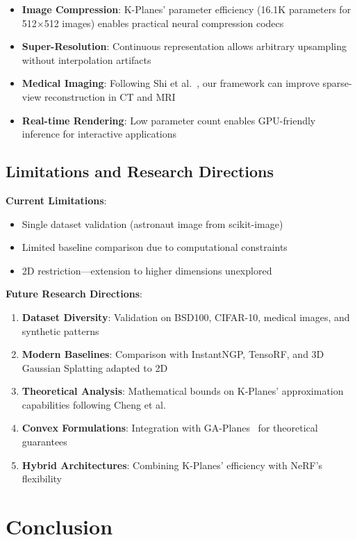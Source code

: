 \documentclass{article}
\begin{document}
\begin{itemize}
\item \textbf{Image Compression}: K-Planes' parameter efficiency (16.1K parameters for 512×512 images) enables practical neural compression codecs
\item \textbf{Super-Resolution}: Continuous representation allows arbitrary upsampling without interpolation artifacts
\item \textbf{Medical Imaging}: Following Shi et al.~\cite{shi2024inr}, our framework can improve sparse-view reconstruction in CT and MRI
\item \textbf{Real-time Rendering}: Low parameter count enables GPU-friendly inference for interactive applications
\end{itemize}

\subsection{Limitations and Research Directions}

\textbf{Current Limitations}:
\begin{itemize}
\item Single dataset validation (astronaut image from scikit-image)
\item Limited baseline comparison due to computational constraints  
\item 2D restriction—extension to higher dimensions unexplored
\end{itemize}

\textbf{Future Research Directions}:
\begin{enumerate}
\item \textbf{Dataset Diversity}: Validation on BSD100, CIFAR-10, medical images, and synthetic patterns
\item \textbf{Modern Baselines}: Comparison with InstantNGP, TensoRF, and 3D Gaussian Splatting adapted to 2D
\item \textbf{Theoretical Analysis}: Mathematical bounds on K-Planes' approximation capabilities following Cheng et al.~\cite{cheng2025lowrank}
\item \textbf{Convex Formulations}: Integration with GA-Planes~\cite{sivgin2024gaplanes} for theoretical guarantees
\item \textbf{Hybrid Architectures}: Combining K-Planes' efficiency with NeRF's flexibility
\end{enumerate}

\section{Conclusion}
\end{document}
